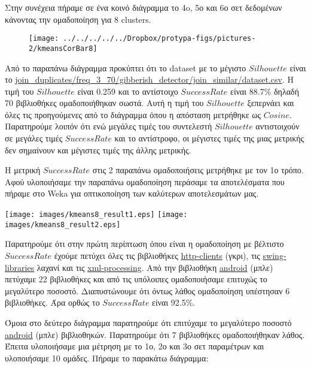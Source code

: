Στην συνέχεια πήραμε σε ένα κοινό διάγραμμα το 4o, 5ο και 6ο σετ δεδομένων κάνοντας την ομαδοποίηση για 8 clusters.

\begin{figure}
\centering
\texttt{[image: ../../../../../Dropbox/protypa-figs/pictures-2/kmeansCorBar8]}
\caption{}
\label{fig:kmeansCorBar8}
\end{figure}

Από το παραπάνω διάγραμμα προκύπτει ότι το dataset με το μέγιστο $Silhouette$ είναι το \url{join_duplicates/freq_3_70/gibberish_detector/join_similar/dataset.csv}. Η τιμή του $Silhouette$ είναι 0.259 και το αντίστοιχο $SuccessRate$ είναι 88.7\% δηλαδή 70 βιβλιοθήκες ομαδοποιήθηκαν σωστά. Αυτή η τιμή του $Silhouette$ ξεπερνάει και όλες τις προηγούμενες από το διάγραμμα όπου η απόσταση μετρήθηκε ως $Cosine$. Παρατηρούμε λοιπόν ότι ενώ μεγάλες τιμές του συντελεστή $Silhouette$ αντιστοιχούν σε μεγάλες τιμές $SuccessRate$ και το αντίστροφο, οι μέγιστες τιμές της μιας μετρικής δεν σημαίνουν και μέγιστες τιμές της άλλης μετρικής.

Η μετρική $Success Rate$ στις 2 παραπάνω ομαδοποιήσεις μετρήθηκε με τον 1ο τρόπο.
Αφού υλοποιήσαμε την παραπάνω ομαδοποίηση περάσαμε τα αποτελέσματα που πήραμε στο Weka για οπτικοποίηση των καλύτερων αποτελεσμάτων μας.
\noindent\begin{minipage}{\linewidth}
    \centering
    \texttt{[image: images/kmeans8\_result1.eps]}
    \texttt{[image: images/kmeans8\_result2.eps]}
    \label{fig:kmeans8_result}
\end{minipage}

Παρατηρούμε ότι στην πρώτη περίπτωση όπου είναι η ομαδοποίηση με βέλτιστο $Success Rate$ έχούμε πετύχει όλες τις βιβλιοθήκες \url{http-clients} (γκρι), τις \url{swing-libraries} λαχανί και τις \url{xml-processing}. Από την βιβλιοθήκη \url{android} (μπλε) πετύχαμε 22 βιβλιοθήκες και από τις υπόλοιπες ομαδοποιήσαμε επιτυχώς το μεγαλύτερο ποσοστό. Διαπυστώνουμε ότι όντως λάθος ομαδοποίηση υπέστησαν 6 βιβλιοθήκες. Άρα ορθώς το $Success Rate$ είναι 92.5\%.

Όμοια στο δεύτερο διάγραμμα παρατηρούμε ότι επιτύχαμε το μεγαλύτερο ποσοστό \url{android} (μπλε) βιβλιοθηκών. Παρατηρούμε ότι 7 βιβλιοθήκες ομαδοποιήθηκαν λάθος. 
Έπειτα υλοποιήσαμε μια μέτρηση με το 1ο, 2ο και 3ο σετ παραμέτρων και υλοποιήσαμε 10 ομάδες. Πήραμε το παρακάτω διάγραμμα:

